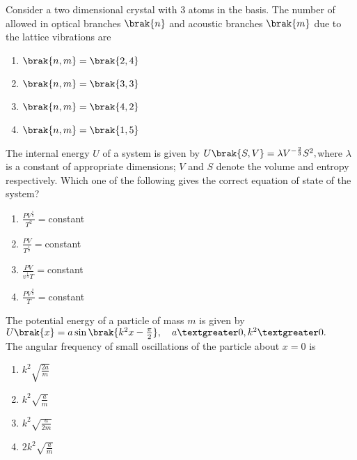     \item Consider a two dimensional crystal with $3$ atoms in the basis. The number of allowed in optical branches $\brak{n}$ and acoustic branches $\brak{m}$ due to the lattice vibrations are
    \begin{enumerate}
        \item $\brak{n,m}=\brak{2,4}$
        \item $\brak{n,m}=\brak{3,3}$
        \item $\brak{n,m}=\brak{4,2}$
        \item $\brak{n,m}=\brak{1,5}$
    \end{enumerate}
    \item The internal energy $U$ of a system is given by $U\brak{S,V}=\lambda V^{-\frac{2}{3}}S^2,$where $\lambda$ is a constant of appropriate dimensions; $V$ and $S$ denote the volume and entropy respectively. Which one of the following gives the correct equation of state of the system?
    \begin{enumerate}
        \item $\frac{PV^{\frac{1}{3}}}{T^2}=$constant
         \item $\frac{PV}{T^{\frac{1}{3}}}=$constant
        \item $\frac{PV}{v^{\frac{1}{3}}T}=$constant
        \item $\frac{PV^{\frac{2}{3}}}{T}=$constant
    \end{enumerate}
    \item The potential energy of a particle of mass $m$ is given by \\
    $U\brak{x}=a\sin\brak{k^2x-\frac{\pi}{2}},\quad a\textgreater 0,k^2\textgreater 0.$\\
    The angular frequency of small oscillations of the particle about $x=0$ is
    \begin{enumerate}
        \item $k^2\sqrt{\frac{2a}{m}}$
        \item $k^2\sqrt{\frac{a}{m}}$
        \item $k^2\sqrt{\frac{a}{2m}}$
        \item $2k^2\sqrt{\frac{a}{m}}$   
    \end{enumerate}
